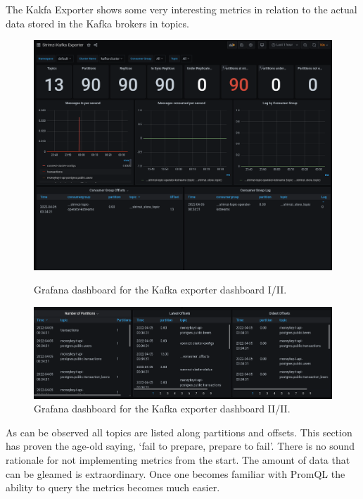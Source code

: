 The Kakfa Exporter shows some very interesting metrics in relation to the actual data stored
in the Kafka brokers in topics.
\begin{figure}[H]
	\centering
	\includegraphics[width=1\linewidth]{figures/kafka_node_exporter_dash.png}
	\caption{Grafana dashboard for the Kafka exporter dashboard I/II.}
	\label{fig:strimzi_kafka_exporter_dashb}
	\includegraphics[width=1\linewidth]{figures/kafka_exporter_topics.png}
	\caption{Grafana dashboard for the Kafka exporter dashboard II/II.}
	\label{fig:strimzi_kafka_exporter_dashb_II}
\end{figure}
As can be observed all topics are listed along partitions and offsets.
\bigbreak
This section has proven the age-old saying, `fail to prepare, prepare to fail'. There is no sound rationale
for not implementing metrics from the start. The amount of data that can be gleamed is extraordinary. Once one becomes familiar with
PromQL the ability to query the metrics becomes much easier.
